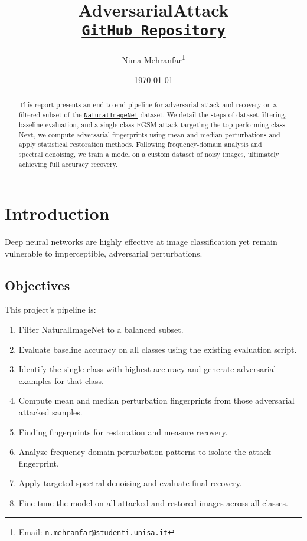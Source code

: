 \documentclass[a4paper,12pt]{report}%
\title{AdversarialAttack\\
\vspace{0.5cm}\href{https://github.com/nimamehranfar/AdversarialAttack}{\texttt{GitHub Repository}}}
\author{Nima Mehranfar\thanks{Email: \href{mailto:n.mehranfar@studenti.unisa.it}{\texttt{n.mehranfar@studenti.unisa.it}}}}
\date{\today}
\begin{document}
\maketitle

\begin{abstract}
This report presents an end-to-end pipeline for adversarial attack and recovery on a filtered subset of the \href{https://zenodo.org/records/5809346}{\texttt{NaturalImageNet}} dataset. We detail the steps of dataset filtering, baseline evaluation, and a single-class FGSM attack targeting the top-performing class. Next, we compute adversarial fingerprints using mean and median perturbations and apply statistical restoration methods. Following frequency-domain analysis and spectral denoising, we train a model on a custom dataset of noisy images, ultimately achieving full accuracy recovery.
\end{abstract}

\tableofcontents
\newpage

\listoffigures
\newpage

\listoftables
\newpage

\chapter{Introduction}
Deep neural networks are highly effective at image classification yet remain vulnerable to imperceptible, adversarial perturbations.

\section{Objectives}
This project’s pipeline is:
\begin{enumerate}
\item Filter NaturalImageNet to a balanced subset.
\item Evaluate baseline accuracy on all classes using the existing evaluation script.
\item Identify the single class with highest accuracy and generate adversarial examples for that class.
\item Compute mean and median perturbation fingerprints from those adversarial attacked samples.
\item Finding fingerprints for restoration and measure recovery.
\item Analyze frequency‑domain perturbation patterns to isolate the attack fingerprint.
\item Apply targeted spectral denoising and evaluate final recovery.
\item Fine-tune the model on all attacked and restored images across all classes.
\end{enumerate}
\end{document}
